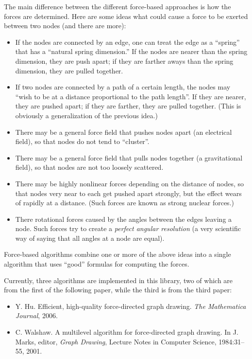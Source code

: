 The main difference between the different force-based approaches is
how the forces are determined. Here are some ideas what could cause a
force to be exerted between two nodes (and there are more):
\begin{itemize}
\item If the nodes are connected by an edge, one can treat the edge as
  a ``spring'' that has a ``natural spring dimension.'' If the nodes
  are nearer than the spring dimension, they are push apart; if they
  are farther aways than the spring dimension, they are pulled
  together.
\item If two nodes are connected by a path of a certain length, the
  nodes may ``wish to be at a distance proportional to the path
  length''. If they are nearer, they are pushed apart; if they are
  farther, they are pulled together. (This is obviously a
  generalization of the previous idea.)
\item There may be a general force field that pushes nodes apart (an
  electrical field), so that nodes do not tend to ``cluster''.
\item There may be a general force field that pulls nodes together (a
  gravitational field), so that nodes are not too loosely scattered.
\item There may be highly nonlinear forces depending on the distance of
  nodes, so that nodes very near to each get pushed apart strongly,
  but the effect wears of rapidly at a distance. (Such forces are
  known as strong nuclear forces.)
\item There rotational forces caused by the angles between the edges
  leaving a node. Such forces try to create a \emph{perfect angular
  resolution} (a very scientific way of saying that all angles
  at a node are equal).
\end{itemize}

Force-based algorithms combine one or more of the above ideas into a
single algorithm that uses ``good'' formulas for computing the
forces.

Currently, three algorithms are implemented in this library, two of
which are from the first of the following paper, while the third is
from the third paper:


\begin{itemize}
\item
  Y. Hu.
  \newblock Efficient, high-quality force-directed graph drawing.
  \newblock \emph{The Mathematica Journal}, 2006.
\item
  C. Walshaw.
  \newblock A multilevel algorithm for force-directed graph
  drawing.
  \newblock In J. Marks, editor, \emph{Graph Drawing}, Lecture Notes in
  Computer Science, 1984:31--55, 2001. 
\end{itemize}


